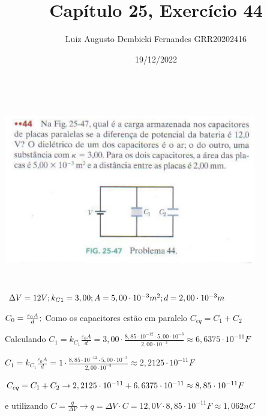 \documentclass[12pt, twoside]{article}
\begin{document}
\title{Capítulo 25, Exercício 44}
\author{Luiz Augusto Dembicki Fernandes GRR20202416}
\date{19/12/2022}
\maketitle

\includegraphics[width=11cm, height=8cm]{44.png}
\begin{doublespacing}
    

$ \Delta V = 12V \space ; k_{C1}= 3,00 \space ; A = 5,00\cdot 10^{-3} m^2 \space ; d = 2,00\cdot 10^{-3} m$ 

$ C_{0} = \frac{\varepsilon_0 A}{d} \space ; $  Como os capacitores estão em paralelo $ C_{eq} = C_1 + C_2 $ 

Calculando $ C_1 = k_{C_1} \frac{\varepsilon_0 A}{d} = 3,00 \cdot \frac{8,85 \cdot 10^{-12} \cdot 5,00\cdot 10^{-3} }{ 2,00\cdot 10^{-3}} \approx  6,6375 \cdot 10^{-11} F$

$ C_1 = k_{C_1} \frac{\varepsilon_0 A}{d} = 1 \cdot \frac{8,85 \cdot 10^{-12} \cdot 5,00\cdot 10^{-3} }{ 2,00\cdot 10^{-3}} \approx  2,2125 \cdot 10^{-11} F$

$ C_{eq} = C_1 + C_2  \space \to \space 2,2125 \cdot 10^{-11} + 6,6375 \cdot 10^{-11} \approx 8,85\cdot 10^{-11} F$ 

e utilizando $ C = \frac{ q }{ \Delta V } \to q = \Delta V \cdot C = 12,0V \cdot 8,85 \cdot 10^{-11}F \approx 1,062nC $

\end{doublespacing}
\end{document}
